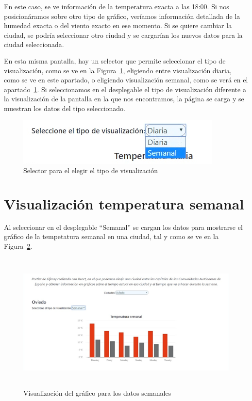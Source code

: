 \documentclass[a4paper, 12pt]{book}
\begin{document}
En este caso, se ve información de la temperatura exacta a las 18:00. Si nos posicionáramos sobre otro tipo de gráfico, veríamos información detallada de la humedad exacta o del viento exacto en ese momento.
Si se quiere cambiar la ciudad, se podría seleccionar otro ciudad y se cargarían los nuevos datos para la ciudad seleccionada.

\vspace{5mm}
En esta misma pantalla, hay un selector que permite seleccionar el tipo de visualización, como se ve en la Figura~\ref{fig:seleccion_tipo}, eligiendo entre visualización diaria, como se ve en este apartado, o eligiendo visualización semanal, como se verá en el apartado~\ref{sec:visualizacion-semanal}.
Si seleccionamos en el desplegable el tipo de visualización diferente a la visualización de la pantalla en la que nos encontramos, la página se carga y se muestran los datos del tipo seleccionado.
\begin{figure}[h]
  \centering
  \includegraphics{img_usadas/seleccion_tipo.png}
  \caption{Selector para el elegir el tipo de visualización}
  \label{fig:seleccion_tipo}
\end{figure}


\section{Visualización temperatura semanal}
\label{sec:visualizacion-semanal}
Al seleccionar en el desplegable ``Semanal'' se cargan los datos para mostrarse el gráfico de la tempetatura semanal en una ciudad, tal y como se ve en la Figura~\ref{fig:pantalla_semanal}.
\begin{figure}[h]
  \centering
  \includegraphics[width=13cm, height=7cm]{img_usadas/pantalla_semanal.png}
  \caption{Visualización del gráfico para los datos semanales}
  \label{fig:pantalla_semanal}
\end{figure}
\end{document}
